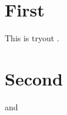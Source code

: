 \documentclass[a4paper,12pt]{report}
\begin{document}
\chapter{First}
This is tryout \textcite{Abiadetal2008}.

\chapter{Second}
\parencite{AghionBolton1997,Allen1990} and \textcite{Zeugner2011}

\printbibliography
\end{document}
